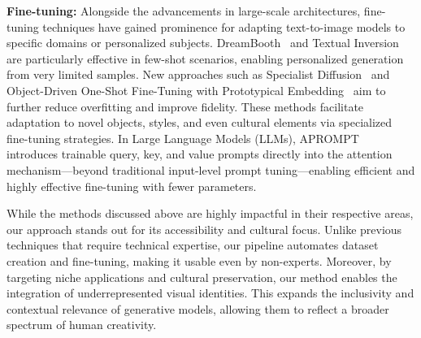 \documentclass[pdflatex,sn-mathphys-num]{sn-jnl}%
\theoremstyle{thmstyleone}%
\theoremstyle{thmstyletwo}%
\theoremstyle{thmstylethree}%
\begin{document}
\textbf{Fine-tuning:} Alongside the advancements in large-scale architectures, fine-tuning techniques have gained prominence for adapting text-to-image models to specific domains or personalized subjects. DreamBooth~\cite{dreambooth} and Textual Inversion~\cite{textualinversion} are particularly effective in few-shot scenarios, enabling personalized generation from very limited samples. New approaches such as Specialist Diffusion~\cite{Specialist-Diffusion} and Object-Driven One-Shot Fine-Tuning with Prototypical Embedding~\cite{lu2024object} aim to further reduce overfitting and improve fidelity. These methods facilitate adaptation to novel objects, styles, and even cultural elements via specialized fine-tuning strategies. In Large Language Models (LLMs), APROMPT~\cite{wang2023aprompt} introduces trainable query, key, and value prompts directly into the attention mechanism—beyond traditional input-level prompt tuning—enabling efficient and highly effective fine-tuning with fewer parameters.





While the methods discussed above are highly impactful in their respective areas, our approach stands out for its accessibility and cultural focus. Unlike previous techniques that require technical expertise, our pipeline automates dataset creation and fine-tuning, making it usable even by non-experts. Moreover, by targeting niche applications and cultural preservation, our method enables the integration of underrepresented visual identities. This expands the inclusivity and contextual relevance of generative models, allowing them to reflect a broader spectrum of human creativity.
\end{document}
